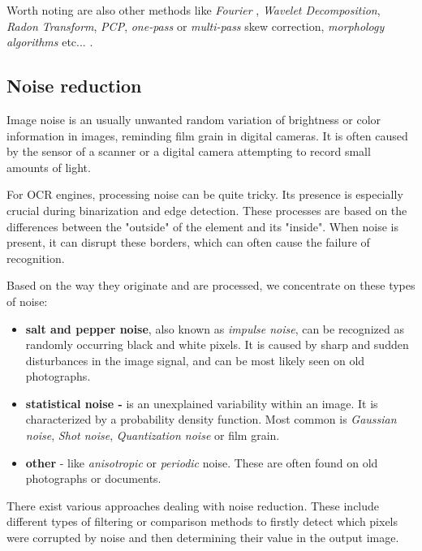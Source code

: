 Worth noting are also other methods like \emph{Fourier} \citep{fourierTransform}, \emph{Wavelet Decomposition}, \emph{Radon Transform}, \emph{PCP}, \emph{one-pass} or \emph{multi-pass} skew correction, \emph{morphology algorithms} etc... \citep{skewBestTechniques}.

\subsection{Noise reduction}

Image noise is an usually unwanted random variation of brightness or color information in images, reminding film grain in digital cameras. It is often caused by the sensor of a scanner or a digital camera attempting to record small amounts of light. 

For OCR engines, processing noise can be quite tricky. Its presence is especially crucial during binarization and edge detection. These processes are based on the differences between the "outside" of the element and its "inside". When noise is present, it can disrupt these borders, which can often cause the failure of recognition.

Based on the way they originate and are processed, we concentrate on these types of noise:

\begin{itemize}
\item\textbf{salt and pepper noise}, also known as \emph{impulse noise}, can be recognized as randomly occurring black and white pixels. It is caused by sharp and sudden disturbances in the image signal, and can be most likely seen on old photographs.

\item\textbf{statistical noise - } is an unexplained variability within an image. It is characterized by a probability density function. Most common is \emph{Gaussian noise}, \emph{Shot noise}, \emph{Quantization noise} or film grain.

\item\textbf{other} - like \emph{anisotropic} or \emph{periodic} noise. These are often found on old photographs or documents.

\end{itemize}

There exist various approaches dealing with noise reduction. These include different types of filtering or comparison methods to firstly detect which pixels were corrupted by noise and then determining their value in the output image.

